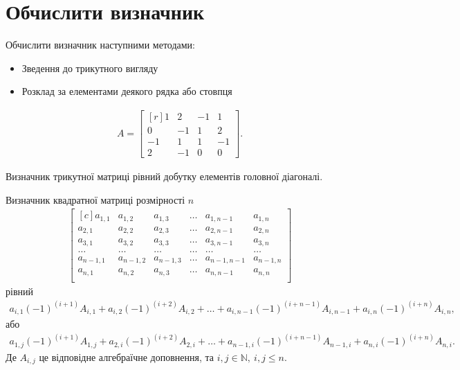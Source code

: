 \section{Обчислити визначник}
Обчислити визначник наступними методами:
\begin{itemize}
	\item Зведення до трикутного вигляду
	\item Розклад за елементами деякого рядка або стовпця
\end{itemize}
\begin{gather}
	A=\begin{bmatrix*}[r]
		1&2&-1&1\\
		0&-1&1&2\\
		-1&1&1&-1\\
		2&-1&0&0
	\end{bmatrix*}.
\end{gather}
\begin{dfn}
	Визначник трикутної матриці рівний добутку елементів головної діагоналі.\label{dfn:diagonal_determiner}
\end{dfn}
\begin{thm}[Лапласа]
		\label{thm:laplas}
	Визначник квадратної матриці розмірності \(n\)
	\begin{gather}
		\begin{bmatrix*}[c]
			a_{1,1}&a_{1,2}&a_{1,3}&\dots&a_{1,n-1}& a_{1,n}\\
			a_{2,1}&a_{2,2}&a_{2,3}&\dots&a_{2,n-1}& a_{2,n}\\
			a_{3,1}&a_{3,2}&a_{3,3}&\dots&a_{3,n-1}& a_{3,n}\\
			\dots&\dots&\dots&\dots&\dots&\dots\\
			a_{n-1,1}&a_{n-1,2}&a_{n-1,3}&\dots&a_{n-1,n-1}&a_{n-1,n}\\
			a_{n,1}&a_{n,2}&a_{n,3}&\dots&a_{n,n-1}& a_{n,n}\\
		\end{bmatrix*}
	\end{gather}
	рівний
	\begin{gather}
		a_{i,1}(-1)^{(i+1)}A_{i,1} + a_{i,2}(-1)^{(i+2)}A_{i,2}  + \dots + a_{i,n-1}(-1)^{(i+n-1)}A_{i,n-1} + a_{i,n}(-1)^{(i+n)}A_{i,n},
	\end{gather}
	або
	\begin{gather}
		a_{1,j}(-1)^{(i+1)}A_{1,j} + a_{2,i}(-1)^{(i+2)}A_{2,i}  + \dots + a_{n-1,i}(-1)^{(i+n-1)}A_{n-1,i} + a_{n,i}(-1)^{(i+n)}A_{n,i}.
	\end{gather}
	Де \(A_{i,j}\) це відповідне алгебраїчне доповнення, та \(i,j\in \mathbb{N},\ i,j \leq n\).
\end{thm}
